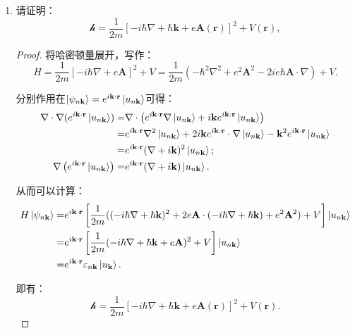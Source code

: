 \documentclass[reqno,a4paper,12pt]{amsart}
\begin{document}
\begin{enumerate}

\item 请证明：
\[
	\mathcal{h} = \frac{1}{2m}[-i\hbar\nabla + \hbar\mathbf{k} + e\mathbf{A}(\mathbf{r})]^2 + V(\mathbf{r}),
\]

\begin{proof}

将哈密顿量展开，写作：
\[
	H = \frac{1}{2m}[-i\hbar\nabla + e\mathbf{A}]^2 + V = \frac{1}{2m}(-\hbar^2\nabla^2 + e^2\mathbf{A}^2 - 2ie\hbar\mathbf{A}\cdot\nabla) + V.
\]

分别作用在$\ket{\psi_{n\mathbf{k}}} = e^{i\mathbf{k} \cdot \mathbf{r}} \ket{u_{n\mathbf{k}}}$可得：
\begin{align*}
	\nabla \cdot \nabla(e^{i\mathbf{k} \cdot \mathbf{r}} \ket{u_{n\mathbf{k}}}) =& \nabla \cdot \left( e^{i\mathbf{k} \cdot \mathbf{r}} \nabla \ket{u_{n\mathbf{k}}} + i\mathbf{k} e^{i\mathbf{k} \cdot \mathbf{r}} \ket{u_{n\mathbf{k}}} \right) \\
	=& e^{i\mathbf{k} \cdot \mathbf{r}} \nabla^2 \ket{u_{n\mathbf{k}}} + 2i\mathbf{k} e^{i\mathbf{k} \cdot \mathbf{r}} \cdot \nabla \ket{u_{n\mathbf{k}}} - \mathbf{k}^2 e^{i\mathbf{k} \cdot \mathbf{r}} \ket{u_{n\mathbf{k}}} \\
	=& e^{i\mathbf{k} \cdot \mathbf{r}} (\nabla + i\mathbf{k})^2 \ket{u_{n\mathbf{k}}}; \\
	\nabla \left( e^{i\mathbf{k} \cdot \mathbf{r}} \ket{u_{n\mathbf{k}}} \right) =& e^{i\mathbf{k} \cdot \mathbf{r}} (\nabla+i\mathbf{k}) \ket{u_{n\mathbf{k}}}.
\end{align*}

从而可以计算：
\begin{align*}
	H \ket{\psi_{n\mathbf{k}}} =& e^{i\mathbf{k} \cdot \mathbf{r}} \left[ \frac{1}{2m}((-i\hbar\nabla + \hbar\mathbf{k})^2 + 2e\mathbf{A} \cdot (-i\hbar\nabla + \hbar\mathbf{k}) + e^2\mathbf{A}^2) + V \right] \ket{u_{n\mathbf{k}}} \\
	=& e^{i\mathbf{k} \cdot \mathbf{r}} \left[ \frac{1}{2m} (-i\hbar\nabla + \hbar\mathbf{k} + e\mathbf{A})^2 + V \right] \ket{u_{n\mathbf{k}}} \\
	=& e^{i\mathbf{k} \cdot \mathbf{r}} \varepsilon_{n\mathbf{k}} \ket{u_{\mathbf{k}}}.
\end{align*}

即有：
\[
	\mathcal{h} = \frac{1}{2m}[-i\hbar\nabla + \hbar\mathbf{k} + e\mathbf{A}(\mathbf{r})]^2 + V(\mathbf{r}).
\]
\end{proof}



\end{enumerate}
\end{document}

